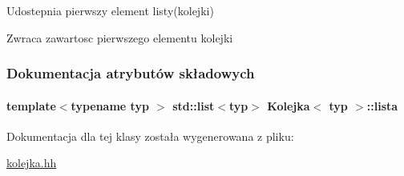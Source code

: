 Udostepnia pierwszy element listy(kolejki) 

\begin{DoxyReturn}{Zwraca}
zawartosc pierwszego elementu kolejki 
\end{DoxyReturn}


\subsubsection{Dokumentacja atrybutów składowych}
\hypertarget{class_kolejka_aa1d0242fadafd97f856d222b73031cd5}{
\paragraph[{lista}]{\setlength{\rightskip}{0pt plus 5cm}template$<$typename typ $>$ std\-::list$<$typ$>$ {\bf Kolejka}$<$ typ $>$\-::lista\hspace{0.3cm}{\ttfamily [private]}}}\label{class_kolejka_aa1d0242fadafd97f856d222b73031cd5}


Dokumentacja dla tej klasy została wygenerowana z pliku\-:\begin{DoxyCompactItemize}
\item 
\hyperlink{kolejka_8hh}{kolejka.\-hh}\end{DoxyCompactItemize}
